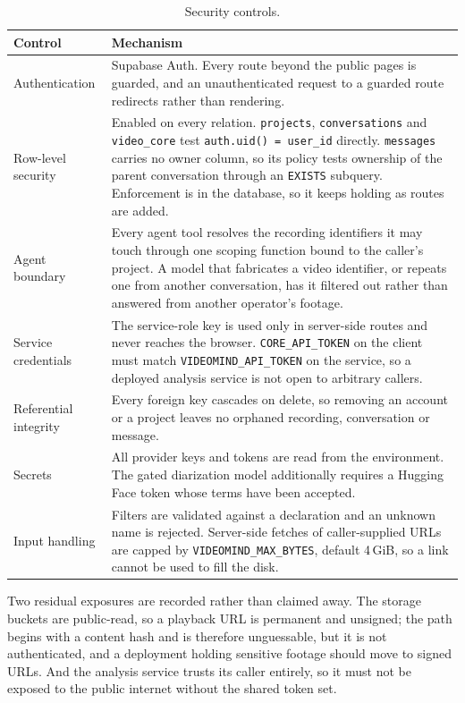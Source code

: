 \documentclass[11pt,a4paper]{article}
\begin{document}
\begin{table}[htbp]
\centering
\small
\begin{tabularx}{\textwidth}{@{}L{3.0cm}X@{}}
\toprule
\textbf{Control} & \textbf{Mechanism} \\
\midrule
Authentication & Supabase Auth. Every route beyond the public pages is guarded, and an unauthenticated request to a guarded route redirects rather than rendering. \\
Row-level security & Enabled on every relation. \texttt{projects},
\texttt{conversations} and \texttt{video\_core} test \texttt{auth.uid() =
user\_id} directly. \texttt{messages} carries no owner column, so its policy
tests ownership of the parent conversation through an \texttt{EXISTS} subquery.
Enforcement is in the database, so it keeps holding as routes are added. \\
Agent boundary & Every agent tool resolves the recording identifiers it may
touch through one scoping function bound to the caller's project. A model that
fabricates a video identifier, or repeats one from another conversation, has it
filtered out rather than answered from another operator's footage. \\
Service credentials & The service-role key is used only in server-side routes
and never reaches the browser. \texttt{CORE\_API\_TOKEN} on the client must match
\texttt{VIDEOMIND\_API\_TOKEN} on the service, so a deployed analysis service is
not open to arbitrary callers. \\
Referential integrity & Every foreign key cascades on delete, so removing an
account or a project leaves no orphaned recording, conversation or message. \\
Secrets & All provider keys and tokens are read from the environment. The gated
diarization model additionally requires a Hugging Face token whose terms have
been accepted. \\
Input handling & Filters are validated against a declaration and an unknown name
is rejected. Server-side fetches of caller-supplied URLs are capped by
\texttt{VIDEOMIND\_MAX\_BYTES}, default 4\,GiB, so a link cannot be used to fill
the disk. \\
\bottomrule
\end{tabularx}
\caption{Security controls.}
\end{table}

Two residual exposures are recorded rather than claimed away. The storage
buckets are public-read, so a playback URL is permanent and unsigned; the path
begins with a content hash and is therefore unguessable, but it is not
authenticated, and a deployment holding sensitive footage should move to signed
URLs. And the analysis service trusts its caller entirely, so it must not be
exposed to the public internet without the shared token set.
\end{document}
